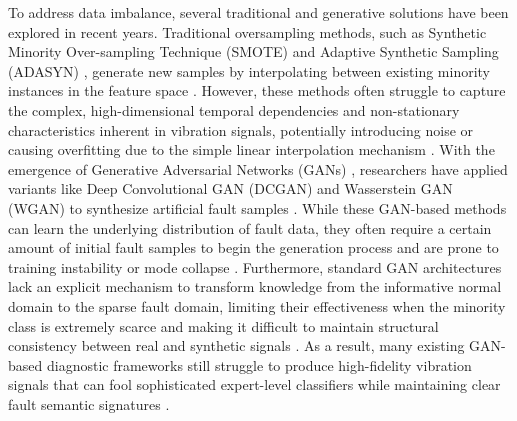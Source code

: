 To address data imbalance, several traditional and generative solutions have been explored in recent years. Traditional oversampling methods, such as Synthetic Minority Over-sampling Technique (SMOTE) \cite{chawla2002smote} and Adaptive Synthetic Sampling (ADASYN) \cite{he2008adasyn}, generate new samples by interpolating between existing minority instances in the feature space \cite{zhao2022cnn_smote_bearing, chawla2002smote, he2008adasyn}. However, these methods often struggle to capture the complex, high-dimensional temporal dependencies and non-stationary characteristics inherent in vibration signals, potentially introducing noise or causing overfitting due to the simple linear interpolation mechanism \cite{liu2020gan_smote_fault, zhao2022cnn_smote_bearing}. With the emergence of Generative Adversarial Networks (GANs) \cite{goodfellow2014gan}, researchers have applied variants like Deep Convolutional GAN (DCGAN) \cite{radford2015dcgan} and Wasserstein GAN (WGAN) \cite{arjovsky2017wgan} to synthesize artificial fault samples \cite{li2021wgan_gp_fault, li2022multi_mode_acgan, radford2015dcgan, arjovsky2017wgan}. While these GAN-based methods can learn the underlying distribution of fault data, they often require a certain amount of initial fault samples to begin the generation process and are prone to training instability or mode collapse \cite{gulrajani2017wgangp, meng2022iacgan}. Furthermore, standard GAN architectures lack an explicit mechanism to transform knowledge from the informative normal domain to the sparse fault domain, limiting their effectiveness when the minority class is extremely scarce and making it difficult to maintain structural consistency between real and synthetic signals \cite{zhu2017cyclegan, alotaibi2021cyclegan_signal}. As a result, many existing GAN-based diagnostic frameworks still struggle to produce high-fidelity vibration signals that can fool sophisticated expert-level classifiers while maintaining clear fault semantic signatures \cite{meng2022iacgan, li2022multi_mode_acgan, shao2018acgan_1dcnn}.


